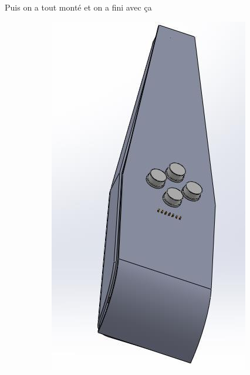 \FloatBarrier

Puis on a tout monté et on a fini avec ça

\begin{figure}
    \begin{subfigure}[m]{.48\linewidth}
        \centering
        \includegraphics[width=\textwidth]{assets/conception1/img165.jpg}
    \end{subfigure}
    \hfill
    \begin{subfigure}[m]{.48\linewidth}

\end{subfigure}
\end{figure}
